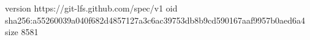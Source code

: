 version https://git-lfs.github.com/spec/v1
oid sha256:a55260039a040f682d4857127a3c6ac39753db8b9cd590167aaf9957b0aed6a4
size 8581
